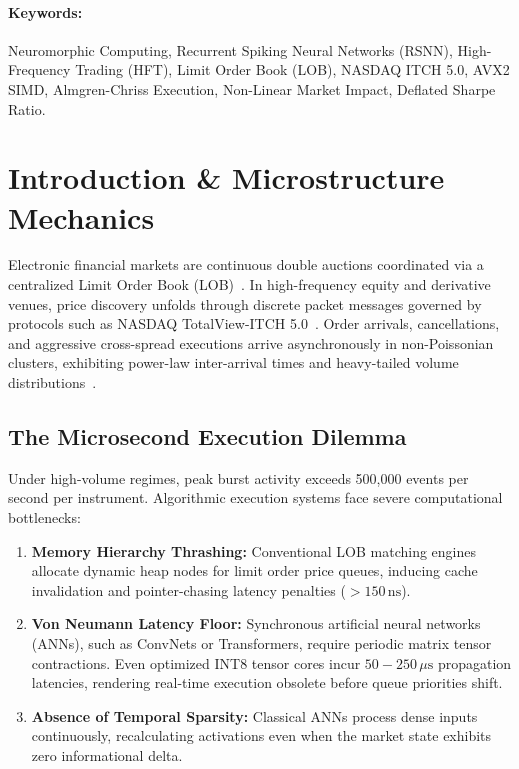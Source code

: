 \documentclass[journal,twocolumn,10pt]{article}
\begin{document}
\paragraph{Keywords:}
Neuromorphic Computing, Recurrent Spiking Neural Networks (RSNN), High-Frequency Trading (HFT), Limit Order Book (LOB), NASDAQ ITCH 5.0, AVX2 SIMD, Almgren-Chriss Execution, Non-Linear Market Impact, Deflated Sharpe Ratio.

\section{Introduction \& Microstructure Mechanics}
Electronic financial markets are continuous double auctions coordinated via a centralized Limit Order Book (LOB)~\cite{hasbrouck2007empirical}. In high-frequency equity and derivative venues, price discovery unfolds through discrete packet messages governed by protocols such as NASDAQ TotalView-ITCH 5.0~\cite{cont2010stochastic}. Order arrivals, cancellations, and aggressive cross-spread executions arrive asynchronously in non-Poissonian clusters, exhibiting power-law inter-arrival times and heavy-tailed volume distributions~\cite{bouchaud2004fluctuations}.

\subsection{The Microsecond Execution Dilemma}
Under high-volume regimes, peak burst activity exceeds 500,000 events per second per instrument. Algorithmic execution systems face severe computational bottlenecks:
\begin{enumerate}
    \item \textbf{Memory Hierarchy Thrashing:} Conventional LOB matching engines allocate dynamic heap nodes for limit order price queues, inducing cache invalidation and pointer-chasing latency penalties ($>150\,\text{ns}$).
    \item \textbf{Von Neumann Latency Floor:} Synchronous artificial neural networks (ANNs), such as ConvNets or Transformers, require periodic matrix tensor contractions. Even optimized INT8 tensor cores incur $50-250\,\mu\text{s}$ propagation latencies, rendering real-time execution obsolete before queue priorities shift.
    \item \textbf{Absence of Temporal Sparsity:} Classical ANNs process dense inputs continuously, recalculating activations even when the market state exhibits zero informational delta.
\end{enumerate}
\end{document}
